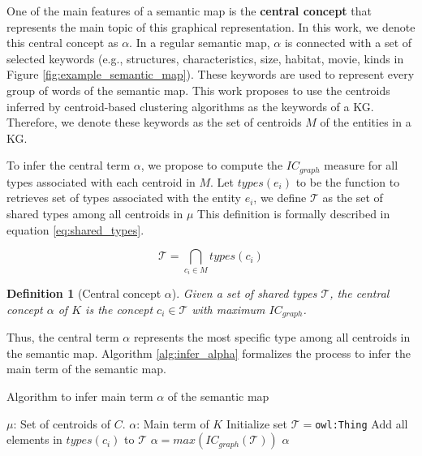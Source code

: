 \documentclass{ieeeaccess}
\newtheorem{Definition}{Definition}
\begin{document}
One of the main features of a semantic map is the 
\textbf{central concept} that represents the main topic of this
graphical representation. In this work, we denote this
central concept as $\alpha$. In a regular semantic map,
$\alpha$ is connected with a set of selected keywords (e.g., 
{structures, characteristics, size, habitat, movie, kinds} in 
Figure \ref{fig:example_semantic_map}). These keywords are used 
to represent every group of words of the semantic map. This work
proposes to use the centroids inferred by centroid-based 
clustering algorithms \cite{Dongkuan2015} as the keywords 
of a KG. Therefore, we denote these keywords as the set 
of centroids $M$ of the entities in a KG.

To infer the central term $\alpha$, we propose to compute the
$IC_{graph}$ measure for all types associated with each centroid
in $M$. Let $types(e_{i})$ to be the function to 
retrieves set of types associated with the entity $e_{i}$, 
we define $\mathcal{T}$ as the set of shared types among 
all centroids in $\mu$ This definition is formally described in
equation \ref{eq:shared_types}.

\begin{equation}
    \label{eq:shared_types}
    \mathcal{T} = \bigcap_{c_{i} \in M} types(c_{i})
\end{equation}

\begin{Definition}[Central concept $\alpha$]
Given a set of shared types 
$\mathcal{T}$, the central concept $\alpha$ of $K$ is the concept
$c_{i} \in \mathcal{T}$ with maximum $IC_{graph}$.
\end{Definition}

Thus, the central term $\alpha$ represents the most specific type
among all centroids in the semantic map. Algorithm \ref{alg:infer_alpha} formalizes the process to infer the main term of the semantic map.

\begin{algorithm}
\caption{Algorithm to infer main term $\alpha$ of the semantic map}
\label{alg:infer_alpha}
\begin{algorithmic}[1]
\renewcommand{\algorithmicrequire}{\textbf{Input:}}
\renewcommand{\algorithmicensure}{\textbf{Output:}}
\REQUIRE $\mu$: Set of centroids of $C$.
\ENSURE $\alpha$: Main term of $K$
\STATE Initialize set $\mathcal{T} =$\texttt{owl:Thing} 
    \STATE Add all elements in $types(c_{i})$ to $\mathcal{T}$
\ENDFOR
\STATE $\alpha = max(IC_{graph}(\mathcal{T}))$
\RETURN $\alpha$
\end{algorithmic} 
\end{algorithm}
\end{document}
